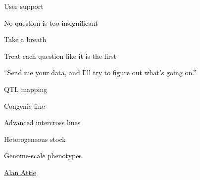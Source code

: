 \documentclass[12pt,t,aspectratio=169]{beamer}
\begin{document}
\begin{frame}{User support}

  \bbi
\item No question is too insignificant
\item Take a breath
\item Treat each question like it is the first
\item ``Send me your data, and I'll try to figure out what's going on.''
  \ei

\end{frame}




\begin{frame}[c]{QTL mapping}

\vspace{5mm}
\end{frame}



\begin{frame}[c]{Congenic line}


\end{frame}




\begin{frame}[c]{Advanced intercross lines}


\end{frame}





\begin{frame}[c]{Heterogeneous stock}

  \vspace{2mm}


\end{frame}


\begin{frame}[c]{Genome-scale phenotypes}

\vspace*{5mm}

\hfill
\href{https://biochem.wisc.edu/faculty/attie}{\scriptsize \lolit Alan
  Attie} \hspace{8mm}

\end{frame}
\end{document}
